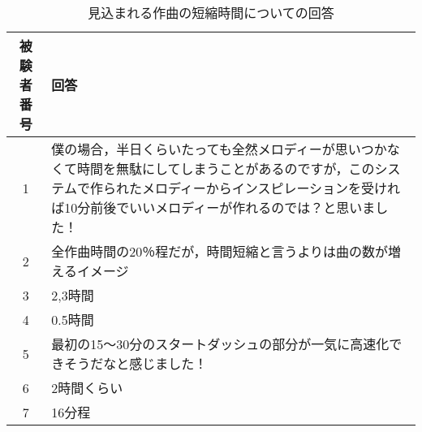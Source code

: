 \begin{table}[htbp]
  \begin{center}
    \caption{見込まれる作曲の短縮時間についての回答}
    \begin{tabular}{cp{30em}}
      \hline
      被験者番号 & 回答\rule[-3mm]{0mm}{8mm} \\ \hline \hline
      1 & 僕の場合，半日くらいたっても全然メロディーが思いつかなくて時間を無駄にしてしまうことがあるのですが，このシステムで作られたメロディーからインスピレーションを受ければ10分前後でいいメロディーが作れるのでは？と思いました！\rule[-3mm]{0mm}{8mm} \\ \hline
      2 & 全作曲時間の20％程だが，時間短縮と言うよりは曲の数が増えるイメージ\rule[-3mm]{0mm}{8mm} \\ \hline
      3 & 2,3時間\rule[-3mm]{0mm}{8mm} \\ \hline
      4 & 0.5時間\rule[-3mm]{0mm}{8mm} \\ \hline
      5 & 最初の15〜30分のスタートダッシュの部分が一気に高速化できそうだなと感じました！\rule[-3mm]{0mm}{8mm} \\ \hline
      6 & 2時間くらい\rule[-3mm]{0mm}{8mm} \\ \hline
      7 & 16分程 \rule[-3mm]{0mm}{8mm} \\ \hline
    \end{tabular}
  \end{center}
\end{table}

